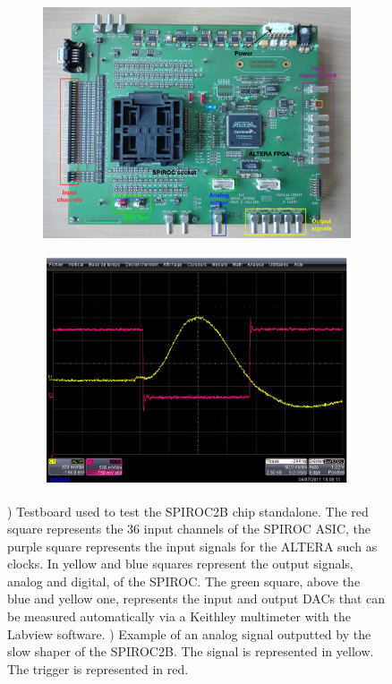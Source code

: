 \begin{figure}[htbp!]
  \centering
  \begin{subfigure}[t]{0.49\textwidth}
    \includegraphics[width=1.\linewidth]{chap4/fig_Commi/TestBoard.jpg}
    \caption{} \label{fig:Testboard_SP2B}
  \end{subfigure}
  \hfill
  \begin{subfigure}[t]{0.49\textwidth}
    \includegraphics[width=1.\linewidth]{chap4/fig_Commi/AnalogSignalSP2B.jpeg}
    \caption{} \label{fig:AnalogSignal_SP2B}
  \end{subfigure}
  \caption{) Testboard used to test the SPIROC2B chip standalone. The red square represents the 36 input channels of the SPIROC ASIC, the purple square represents the input signals for the ALTERA such as clocks. In yellow and blue squares represent the output signals, analog and digital, of the SPIROC. The green square, above the blue and yellow one, represents the input and output DACs that can be measured automatically via a Keithley multimeter with the Labview software. ) Example of an analog signal outputted by the slow shaper of the SPIROC2B. The signal is represented in yellow. The trigger is represented in red.}
\end{figure}

